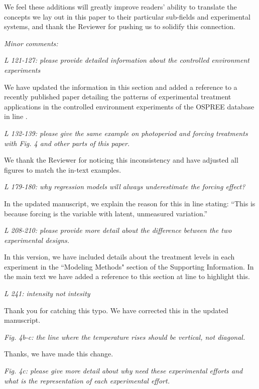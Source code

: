 \documentclass[11pt]{article}
\begin{document}
We feel these additions will greatly improve readers' ability to translate the concepts we lay out in this paper to their particular sub-fields and experimental systems, and thank the Reviewer for pushing us to solidify this connection.

\emph{Minor comments:}

\emph{L 121-127: please provide detailed information about the controlled environment experiments}

We have updated the information in this section and added a reference to a recently published paper detailing the patterns of experimental treatment applications in the controlled environment experiments of the OSPREE database in line .

\emph{L 132-139: please give the same example on photoperiod and forcing treatments with Fig. 4 and other parts of this paper.}

We thank the Reviewer for noticing this inconsistency and have adjusted all figures to match the in-text examples.

\emph{L 179-180: why regression models will always underestimate the forcing effect?}

In the updated manuscript, we explain the reason for this in line  stating: ``This is because forcing is the variable with latent, unmeasured variation.''

\emph{L 208-210: please provide more detail about the difference between the two experimental designs.}

In this version, we have included details about the treatment levels in each experiment in the ``Modeling Methods" section of the Supporting Information. In the main text we have added a reference to this section at line  to highlight this.

\emph{L 241: intensity not intesity}

Thank you for catching this typo. We have corrected this in the updated manuscript.

\emph{Fig. 4b-c: the line where the temperature rises should be vertical, not diagonal.}

Thanks, we have made this change.

\emph{Fig. 4c: please give more detail about why need these experimental efforts and what is the representation of each experimental effort.}
\end{document}
